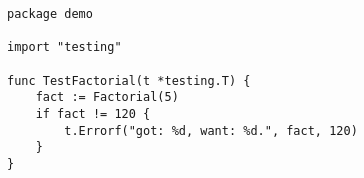 \begin{lstlisting}[caption=A basic Go test,label=lst:go_test,float,floatplacement=H]
package demo

import "testing"

func TestFactorial(t *testing.T) {
    fact := Factorial(5)
    if fact != 120 {
        t.Errorf("got: %d, want: %d.", fact, 120)
    }
}
\end{lstlisting}